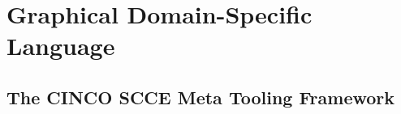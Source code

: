 \chapter{Graphical Domain-Specific Language}
\label{ch:chap2}

\section{The CINCO SCCE Meta Tooling Framework}